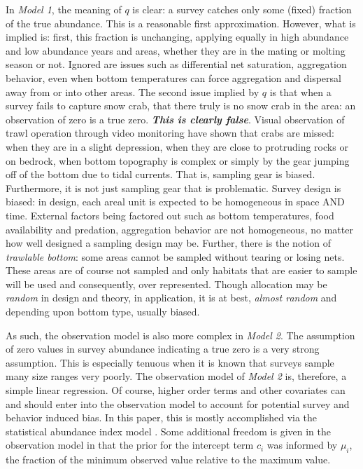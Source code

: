 \documentclass[
	letterpaper, %
	10pt, %
]{article}
\begin{document}
In \emph{Model 1}, the meaning of 
$q$ is clear: a survey catches only some (fixed) fraction of the true
abundance. This is a reasonable first approximation. However, what
is implied is: first, this fraction is unchanging, applying equally
in high abundance and low abundance years and areas, whether they
are in the mating or molting season or not. Ignored are issues such
as differential net saturation, aggregation behavior, even when bottom
temperatures can force aggregation and dispersal away from or into
other areas. The second issue implied by 
$q$ is that when a survey fails to capture snow crab, that there truly
is no snow crab in the area: an observation of zero is a true zero.
\textbf{\emph{This is clearly false}}. Visual observation of trawl operation
through video monitoring have shown that crabs are missed: when they
are in a slight depression, when they are close to protruding rocks
or on bedrock, when bottom topography is complex or simply by the
gear jumping off of the bottom due to tidal currents. That is, sampling
gear is biased. Furthermore, it is not just sampling gear that is
problematic. Survey design is biased: in design, each areal unit is
expected to be homogeneous in space AND time. External factors being
factored out such as bottom temperatures, food availability and predation,
aggregation behavior are not homogeneous, no matter how well designed
a sampling design may be. Further, there is the notion of \emph{trawlable
bottom}: some areas cannot be sampled without tearing or losing
nets. These areas are of course not sampled and only habitats that
are easier to sample will be used and consequently, over represented.
Though allocation may be \emph{random} in design and theory, in application,
it is at best, \emph{almost random} and depending upon bottom type,
usually biased.

As such, the observation model is also more complex in \emph{Model 2}. The
assumption of zero values in survey abundance indicating a true zero
is a very strong assumption. This is especially tenuous when it is
known that surveys sample many size ranges very poorly. The observation
model of \emph{Model 2} is, therefore, a simple linear regression. Of course,
higher order terms and other covariates can and should enter into
the observation model to account for potential survey and behavior
induced bias. In this paper, this is mostly accomplished via the statistical
abundance index model \cite{Choi_et_al_2022}. Some additional freedom is given in the observation model in that the prior for the intercept term 
$c_{i}$ was informed by 
$\mu_{i}$, the fraction of the minimum observed value relative to the maximum
value.
\end{document}
